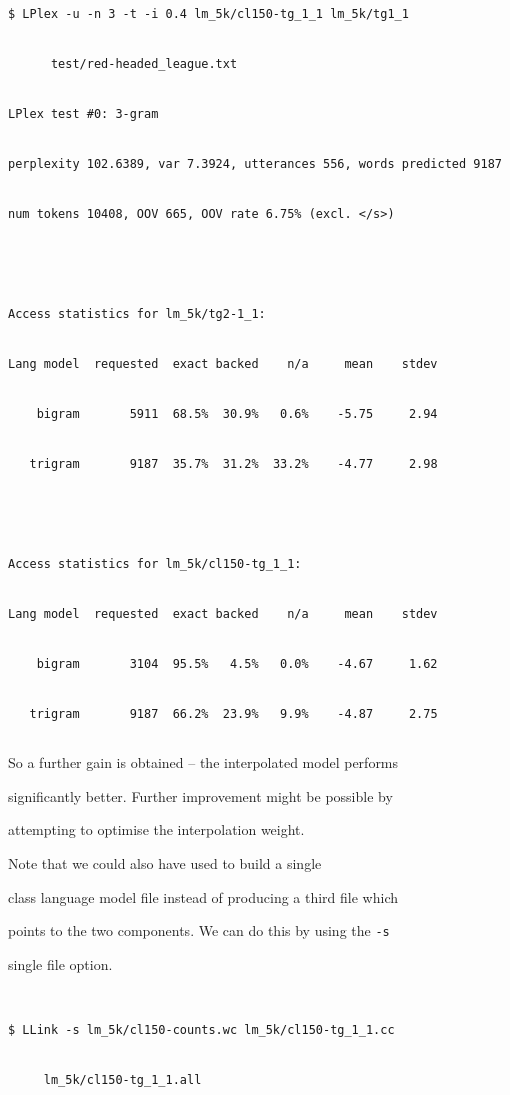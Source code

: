 \begin{verbatim}


$ LPlex -u -n 3 -t -i 0.4 lm_5k/cl150-tg_1_1 lm_5k/tg1_1


      test/red-headed_league.txt


LPlex test #0: 3-gram


perplexity 102.6389, var 7.3924, utterances 556, words predicted 9187


num tokens 10408, OOV 665, OOV rate 6.75% (excl. </s>)


 


Access statistics for lm_5k/tg2-1_1:


Lang model  requested  exact backed    n/a     mean    stdev


    bigram       5911  68.5%  30.9%   0.6%    -5.75     2.94


   trigram       9187  35.7%  31.2%  33.2%    -4.77     2.98


 


Access statistics for lm_5k/cl150-tg_1_1:


Lang model  requested  exact backed    n/a     mean    stdev


    bigram       3104  95.5%   4.5%   0.0%    -4.67     1.62


   trigram       9187  66.2%  23.9%   9.9%    -4.87     2.75


\end{verbatim} %


So a further gain is obtained -- the interpolated model performs


significantly better.  Further improvement might be possible by


attempting to optimise the interpolation weight.





Note that we could also have used  to build a single


class language model file instead of producing a third file which


points to the two components.  We can do this by using the {\tt -s}


single file option.


\begin{verbatim}


$ LLink -s lm_5k/cl150-counts.wc lm_5k/cl150-tg_1_1.cc


     lm_5k/cl150-tg_1_1.all


\end{verbatim} %


